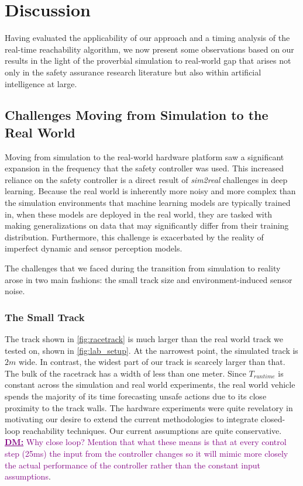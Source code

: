 \documentclass[manuscript,screen,review]{acmart}
\newcommand{\diego}[1]{\textcolor{purple}{\textbf{\underline{DM:}} #1}}
\begin{document}
\section{Discussion}

Having evaluated the applicability of our approach and a timing analysis of the real-time reachability algorithm, we now present some observations based on our results in the light of the proverbial simulation to real-world gap that arises not only in the safety assurance research literature but also within artificial intelligence at large.

\subsection{Challenges Moving from Simulation to the Real World}

Moving from simulation to the real-world hardware platform saw a significant expansion in the frequency that the safety controller was used. This increased reliance on the safety controller is a direct result of \emph{sim2real} challenges in deep learning. Because the real world is inherently more noisy and more complex than the simulation environments that machine learning models are typically trained in, when these models are deployed in the real world, they are tasked with making generalizations on data that may significantly differ from their training distribution. Furthermore, this challenge is exacerbated by the reality of imperfect dynamic and sensor perception models\cite{ivanov2020case}.

The challenges that we faced during the transition from simulation to reality arose in two main fashions: the small track size and environment-induced sensor noise.

\subsubsection{The Small Track} The track shown in \ref{fig:racetrack} is much larger than the real world track we tested on, shown in \ref{fig:lab_setup}. At the narrowest point, the simulated track is $2m$ wide. In contrast, the widest part of our track is scarcely larger than that. The bulk of the racetrack has a width of less than one meter. Since $T_{runtime}$ is constant across the simulation and real world experiments, the real world vehicle spends the majority of its time forecasting unsafe actions due to its close proximity to the track walls. The hardware experiments were quite revelatory in motivating our desire to extend the current methodologies to integrate closed-loop reachability techniques. Our current assumptions are quite conservative. \diego{Why close loop? Mention that what these means is that at every control step (25ms) the input from the controller changes so it will mimic more closely the actual performance of the controller rather than the constant input assumptions}.
\end{document}
